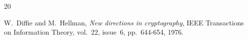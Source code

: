 \documentclass{llncs}
\begin{document}
\begin{thebibliography}{20}



W.~Diffie and M.~Hellman,
\emph{New directions in cryptography},
IEEE Transactions on Information Theory, vol.~22, issue~6, pp.~644-654, 1976.









\end{thebibliography}
\end{document}

